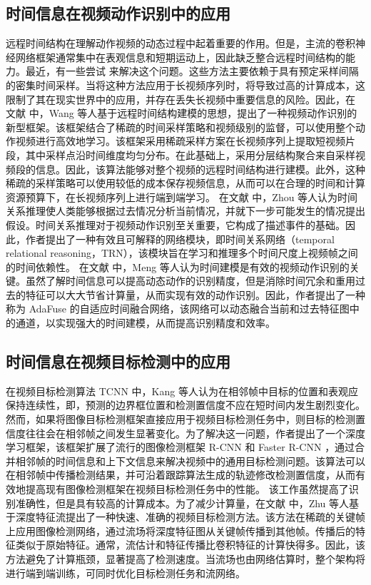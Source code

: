 \subsection{时间信息在视频动作识别中的应用}
远程时间结构在理解动作视频的动态过程中起着重要的作用。但是，主流的卷积神经网络框架通常集中在表观信息和短期运动上，因此缺乏整合远程时间结构的能力。最近，有一些尝试 \cite{Motionlets} 来解决这个问题。这些方法主要依赖于具有预定采样间隔的密集时间采样。当将这种方法应用于长视频序列时，将导致过高的计算成本，这限制了其在现实世界中的应用，并存在丢失长视频中重要信息的风险。因此，在 文献 \cite{TSN} 中，Wang 等人基于远程时间结构建模的思想，提出了一种视频动作识别的新型框架。该框架结合了稀疏的时间采样策略和视频级别的监督，可以使用整个动作视频进行高效地学习。该框架采用稀疏采样方案在长视频序列上提取短视频片段，其中采样点沿时间维度均匀分布。在此基础上，采用分层结构聚合来自采样视频段的信息。因此，该算法能够对整个视频的远程时间结构进行建模。此外，这种稀疏的采样策略可以使用较低的成本保存视频信息，从而可以在合理的时间和计算资源预算下，在长视频序列上进行端到端学习。%
在文献 \cite{TRN} 中，Zhou 等人认为时间关系推理使人类能够根据过去情况分析当前情况，并就下一步可能发生的情况提出假设。时间关系推理对于视频动作识别至关重要，它构成了描述事件的基础。因此，作者提出了一种有效且可解释的网络模块，即时间关系网络（temporal relational reasoning，TRN），该模块旨在学习和推理多个时间尺度上视频帧之间的时间依赖性。%
在文献 \cite{AdaFuse} 中，Meng 等人认为时间建模是有效的视频动作识别的关键。虽然了解时间信息可以提高动态动作的识别精度，但是消除时间冗余和重用过去的特征可以大大节省计算量，从而实现有效的动作识别。因此，作者提出了一种称为 AdaFuse 的自适应时间融合网络，该网络可以动态融合当前和过去特征图中的通道，以实现强大的时间建模，从而提高识别精度和效率。%
\subsection{时间信息在视频目标检测中的应用}
在视频目标检测算法 TCNN \cite{TCNN} 中，Kang 等人认为在相邻帧中目标的位置和表观应保持连续性，即，预测的边界框位置和检测置信度不应在短时间内发生剧烈变化。然而，如果将图像目标检测框架直接应用于视频目标检测任务中，则目标的检测置信度往往会在相邻帧之间发生显著变化。为了解决这一问题，作者提出了一个深度学习框架，该框架扩展了流行的图像检测框架 R-CNN \cite{girshick2014rich} 和 Faster R-CNN \cite{ren2015faster}，通过合并相邻帧的时间信息和上下文信息来解决视频中的通用目标检测问题。该算法可以在相邻帧中传播检测结果，并可沿着跟踪算法生成的轨迹修改检测置信度，从而有效地提高现有图像检测框架在视频目标检测任务中的性能。%
该工作虽然提高了识别准确性，但是具有较高的计算成本。为了减少计算量，在文献 \cite{DeepFeature} 中，Zhu 等人基于深度特征流提出了一种快速、准确的视频目标检测方法。该方法在稀疏的关键帧上应用图像检测网络，通过流场将深度特征图从关键帧传播到其他帧。传播后的特征类似于原始特征。通常，流估计和特征传播比卷积特征的计算快得多。因此，该方法避免了计算瓶颈，显著提高了检测速度。当流场也由网络估算时，整个架构将进行端到端训练，可同时优化目标检测任务和流网络。%
